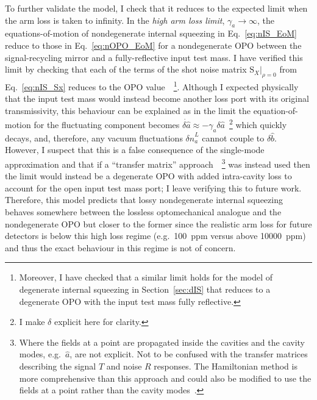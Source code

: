 To further validate the model, I check that it reduces to the expected limit when the arm loss is taken to infinity. 
In the \emph{high arm loss limit}, $\gamma_a\rightarrow\infty$, the equations-of-motion of nondegenerate internal squeezing in Eq.~\ref{eq:nIS_EoM} reduce to those in Eq.~\ref{eq:nOPO_EoM} for a nondegenerate OPO between the signal-recycling mirror and a fully-reflective input test mass.
I have verified this limit by checking that each of the terms of the shot noise matrix $\text{S}_X|_{\rho=0}$ from Eq.~\ref{eq:nIS_Sx} reduces to the OPO value~\cite{}~\footnote{Moreover, I have checked that a similar limit holds for the model of degenerate internal squeezing in Section~\ref{sec:dIS} that reduces to a degenerate OPO with the input test mass fully reflective.}.
Although I expected physically that the input test mass would instead become another loss port with its original transmissivity, this behaviour can be explained as in the limit the equation-of-motion for the fluctuating component becomes $\dot{\delta\hat a}\approx -\gamma_a \delta\hat a$~\footnote{I make $\delta$ explicit here for clarity.} which quickly decays, and, therefore, any vacuum fluctuations $\delta\hat n^L_a$ cannot couple to $\delta\hat b$. However, I suspect that this is a false consequence of the single-mode approximation and that if a ``transfer matrix'' approach~\cite{finesse,}~\footnote{Where the fields at a point are propagated inside the cavities and the cavity modes, e.g.\ $\hat a$, are not explicit. Not to be confused with the transfer matrices describing the signal $T$ and noise $R$ responses. The Hamiltonian method is more comprehensive than this approach and could also be modified to use the fields at a point rather than the cavity modes~\cite{}.} was instead used then the limit would instead be a degenerate OPO with added intra-cavity loss to account for the open input test mass port; I leave verifying this to future work.
Therefore, this model predicts that lossy nondegenerate internal squeezing behaves somewhere between the lossless optomechanical analogue and the nondegenerate OPO but closer to the former since the realistic arm loss for future detectors is below this high loss regime (e.g.\ 100~ppm versus above 10000~ppm) and thus the exact behaviour in this regime is not of concern. %

